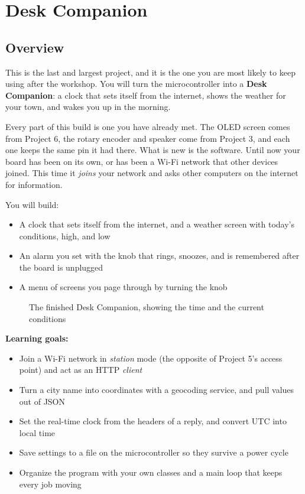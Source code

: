 \chapter{Desk Companion}

\section{Overview}
This is the last and largest project, and it is the one you are most likely to keep using after
the workshop. You will turn the microcontroller into a \textbf{Desk Companion}: a clock that sets
itself from the internet, shows the weather for your town, and wakes you up in the morning.

Every part of this build is one you have already met. The OLED screen comes from Project 6, the
rotary encoder and speaker come from Project 3, and each one keeps the same pin it had there. What
is new is the software. Until now your board has been on its own, or has been a Wi-Fi network that
other devices joined. This time it \emph{joins} your network and asks other computers on the
internet for information.

You will build:
\begin{itemize}
    \item A clock that sets itself from the internet, and a weather screen with today's conditions,
          high, and low
    \item An alarm you set with the knob that rings, snoozes, and is remembered after the board is
          unplugged
    \item A menu of screens you page through by turning the knob
\end{itemize}

\begin{figure}[H]
\centering
    \caption{The finished Desk Companion, showing the time and the current conditions}
\end{figure}

\begin{tcolorbox}[colback=blue!5!white,colframe=blue!40!black]
    \textbf{Learning goals:}
    \begin{itemize}
        \item Join a Wi-Fi network in \emph{station} mode (the opposite of Project 5's access point)
              and act as an HTTP \emph{client}
        \item Turn a city name into coordinates with a geocoding service, and pull values out of JSON
        \item Set the real-time clock from the headers of a reply, and convert UTC into local time
        \item Save settings to a file on the microcontroller so they survive a power cycle
        \item Organize the program with your own classes and a main loop that keeps every job moving
    \end{itemize}
\end{tcolorbox}

